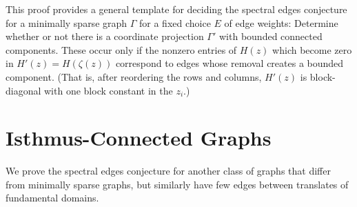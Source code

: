 \documentclass[12pt]{amsart}
\theoremstyle{remark}
\newenvironment{Remark}
{\pushQED{\qed}\renewcommand{\qedsymbol}{$\diamond$}\remark}
{\popQED\endremark}
\begin{document}
\begin{Remark}
  This proof provides a general template for deciding the spectral edges conjecture for a minimally sparse graph $\Gamma$
  for a fixed choice $E$ of edge weights:
  Determine whether or not there is a coordinate projection $\Gamma'$ with bounded connected components.
  These occur only if the nonzero entries of $H(z)$ which become zero in $H'(z)=H(\zeta(z))$ correspond to edges
  whose removal creates a bounded component.
  (That is, after reordering the rows and columns, $H'(z)$  is block-diagonal with one block constant in the $z_i$.)
\end{Remark}



%
\section{Isthmus-Connected Graphs}\label{S:Isthmus}


We prove the spectral edges conjecture for another class of graphs that differ from minimally sparse graphs, but
similarly have few edges between translates of fundamental domains.
  
\end{document}
